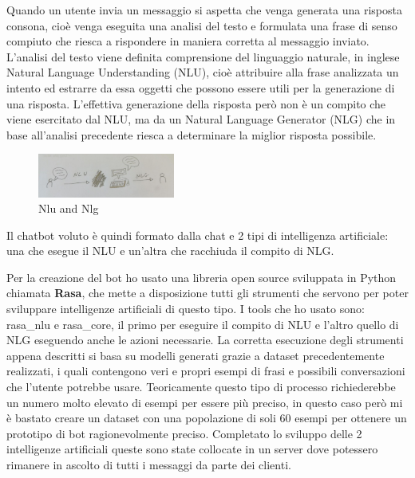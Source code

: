 Quando un utente invia un messaggio si aspetta che venga generata una risposta consona, cioè venga eseguita una analisi del testo e formulata una frase di senso compiuto che riesca a rispondere in maniera corretta al messaggio inviato.
L'analisi del testo viene definita comprensione del linguaggio naturale, in inglese Natural Language Understanding (NLU), cioè attribuire alla frase analizzata un intento ed estrarre da essa oggetti che possono essere utili per la generazione di una risposta.
L'effettiva generazione della risposta però non è un compito che viene esercitato dal NLU, ma da un Natural Language Generator (NLG) che in base all'analisi precedente riesca a determinare la miglior risposta possibile.
\begin{figure}[H]
 \centering
    \includegraphics[width=0.4\textwidth]{img/nlu_nlg.jpg}
 \caption{Nlu and Nlg}
\end{figure}
Il chatbot voluto è quindi formato dalla chat e 2 tipi di intelligenza artificiale: una che esegue il NLU e un'altra che racchiuda il compito di NLG.

Per la creazione del bot ho usato una libreria open source sviluppata in Python chiamata \textbf{Rasa}, che mette a disposizione tutti gli strumenti che servono per poter sviluppare intelligenze artificiali di questo tipo. I tools che ho usato sono: rasa\_nlu e rasa\_core, il primo per eseguire il compito di NLU e l'altro quello di NLG eseguendo anche le azioni necessarie.
La corretta esecuzione degli strumenti appena descritti si basa su modelli generati grazie a dataset precedentemente realizzati, i quali contengono veri e propri esempi di frasi e possibili conversazioni che l'utente potrebbe usare.
Teoricamente questo tipo di processo richiederebbe un numero molto elevato di esempi per essere più preciso, in questo caso però mi è bastato creare un dataset con una popolazione di soli 60 esempi per ottenere un prototipo di bot ragionevolmente preciso.
Completato lo sviluppo delle 2 intelligenze artificiali queste sono state collocate in un server dove potessero rimanere in ascolto di tutti i messaggi da parte dei clienti.
